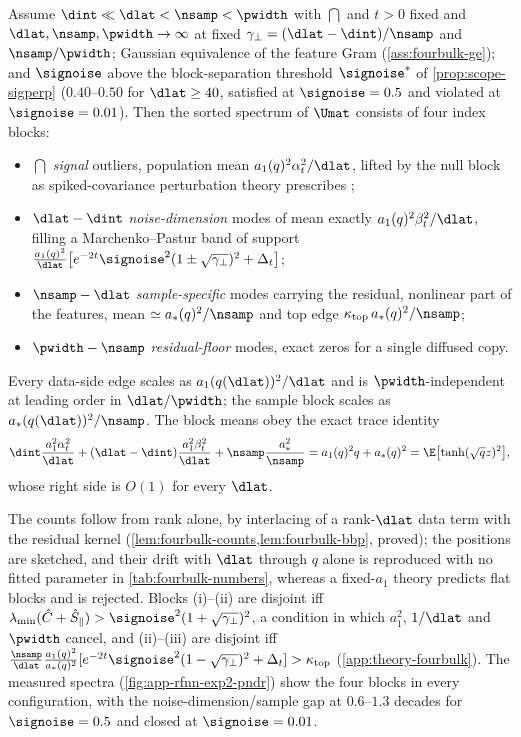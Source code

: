 \begin{proposition}\label{prop:fourblock-9}\label{prop:fourbulk-main}
Assume $\dint\ll\dlat<\nsamp<\pwidth$ with $\dint$ and $t>0$ fixed and $\dlat,\nsamp,\pwidth\to\infty$ at fixed $\gamma_\perp=(\dlat-\dint)/\nsamp$ and $\nsamp/\pwidth$; Gaussian equivalence of the feature Gram (\cref{ass:fourbulk-ge}); and $\signoise$ above the block-separation threshold $\signoise^*$ of \cref{prop:scope-sigperp} ($0.40$--$0.50$ for $\dlat\ge40$, satisfied at $\signoise=0.5$ and violated at $\signoise=0.01$). Then the sorted spectrum of $\Umat$ consists of four index blocks:
\begin{itemize}\setlength\itemsep{0pt}
\item[(i)] $\dint$ \emph{signal} outliers, population mean $a_1(q)^2\alpha_t^2/\dlat$, lifted by the null block as spiked-covariance perturbation theory prescribes \citep{baik2005phase};
\item[(ii)] $\dlat-\dint$ \emph{noise-dimension} modes of mean exactly $a_1(q)^2\beta_t^2/\dlat$, filling a Marchenko--Pastur band \citep{marchenko1967distribution} of support $\tfrac{a_1(q)^2}{\dlat}\bigl[e^{-2t}\signoise^2(1\pm\sqrt{\gamma_\perp})^2+\Delta_t\bigr]$;
\item[(iii)] $\nsamp-\dlat$ \emph{sample-specific} modes carrying the residual, nonlinear part of the features, mean $\simeq a_*(q)^2/\nsamp$ and top edge $\kappa_{\rm top}\,a_*(q)^2/\nsamp$;
\item[(iv)] $\pwidth-\nsamp$ \emph{residual-floor} modes, exact zeros for a single diffused copy.
\end{itemize}
Every data-side edge scales as $a_1(q(\dlat))^2/\dlat$ and is $\pwidth$-independent at leading order in $\dlat/\pwidth$; the sample block scales as $a_*(q(\dlat))^2/\nsamp$. The block means obey the exact trace identity
\begin{equation}\label{eq:fourbulk-trace-main}
\dint\frac{a_1^2\alpha_t^2}{\dlat}+(\dlat-\dint)\frac{a_1^2\beta_t^2}{\dlat}+\nsamp\frac{a_*^2}{\nsamp}=a_1(q)^2q+a_*(q)^2=\E\bigl[\tanh(\sqrt qz)^2\bigr],
\end{equation}
whose right side is $O(1)$ for every $\dlat$.
\end{proposition}
The counts follow from rank alone, by interlacing of a rank-$\dlat$ data term with the residual kernel (\cref{lem:fourbulk-counts,lem:fourbulk-bbp}, proved); the positions are sketched, and their drift with $\dlat$ through $q$ alone is reproduced with no fitted parameter in \cref{tab:fourbulk-numbers}, whereas a fixed-$a_1$ theory predicts flat blocks and is rejected. Blocks (i)--(ii) are disjoint iff $\lambda_{\min}(\hat C+\hat S_\parallel)>\signoise^2(1+\sqrt{\gamma_\perp})^2$, a condition in which $a_1^2$, $1/\dlat$ and $\pwidth$ cancel, and (ii)--(iii) are disjoint iff $\tfrac{\nsamp}{\dlat}\tfrac{a_1(q)^2}{a_*(q)^2}[e^{-2t}\signoise^2(1-\sqrt{\gamma_\perp})^2+\Delta_t]>\kappa_{\rm top}$ (\cref{app:theory-fourbulk}).\label{cor:fourbulk-separation-main} The measured spectra (\cref{fig:app-rfnn-exp2-pndr}) show the four blocks in every configuration, with the noise-dimension/sample gap at $0.6$--$1.3$ decades for $\signoise=0.5$ and closed at $\signoise=0.01$.

